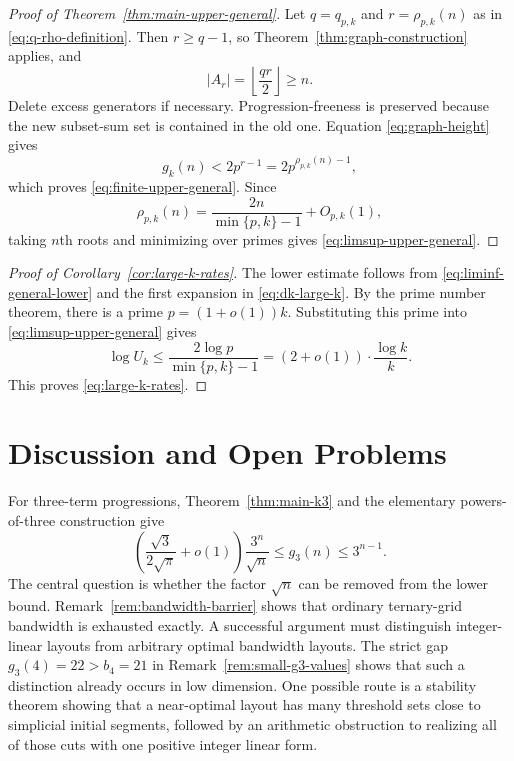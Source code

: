 \documentclass[11pt]{article}
\numberwithin{equation}{section}
\theoremstyle{definition}
\theoremstyle{remark}
\newcommand{\floor}[1]{\left\lfloor #1\right\rfloor}
\begin{document}
\begin{proof}[Proof of Theorem~\ref{thm:main-upper-general}]
Let $q=q_{p,k}$ and $r=\rho_{p,k}(n)$ as in \eqref{eq:q-rho-definition}. Then $r\ge q-1$, so Theorem~\ref{thm:graph-construction} applies, and
\[
|A_r|=\floor{\frac{qr}{2}}\ge n.
\]
Delete excess generators if necessary. Progression-freeness is preserved because the new subset-sum set is contained in the old one. Equation \eqref{eq:graph-height} gives
\[
g_k(n)<2p^{r-1}=2p^{\rho_{p,k}(n)-1},
\]
which proves \eqref{eq:finite-upper-general}. Since
\[
\rho_{p,k}(n)=\frac{2n}{\min\{p,k\}-1}+O_{p,k}(1),
\]
taking $n$th roots and minimizing over primes gives \eqref{eq:limsup-upper-general}.
\end{proof}

\begin{proof}[Proof of Corollary~\ref{cor:large-k-rates}]
The lower estimate follows from \eqref{eq:liminf-general-lower} and the first expansion in \eqref{eq:dk-large-k}. By the prime number theorem, there is a prime $p=(1+o(1))k$. Substituting this prime into \eqref{eq:limsup-upper-general} gives
\[
\log U_k\le\frac{2\log p}{\min\{p,k\}-1}
 =(2+o(1))\cdot\frac{\log k}{k}.
\]
This proves \eqref{eq:large-k-rates}.
\end{proof}

\section{Discussion and Open Problems}\label{sec:discussion}

For three-term progressions, Theorem~\ref{thm:main-k3} and the elementary powers-of-three construction give
\begin{equation}\label{eq:k3-current-gap}
\left(\frac{\sqrt3}{2\sqrt\pi}+o(1)\right)\frac{3^n}{\sqrt n}
 \le g_3(n)\le3^{n-1}.
\end{equation}
The central question is whether the factor $\sqrt n$ can be removed from the lower bound. Remark~\ref{rem:bandwidth-barrier} shows that ordinary ternary-grid bandwidth is exhausted exactly. A successful argument must distinguish integer-linear layouts from arbitrary optimal bandwidth layouts. The strict gap $g_3(4)=22>b_4=21$ in Remark~\ref{rem:small-g3-values} shows that such a distinction already occurs in low dimension. One possible route is a stability theorem showing that a near-optimal layout has many threshold sets close to simplicial initial segments, followed by an arithmetic obstruction to realizing all of those cuts with one positive integer linear form.
\end{document}
